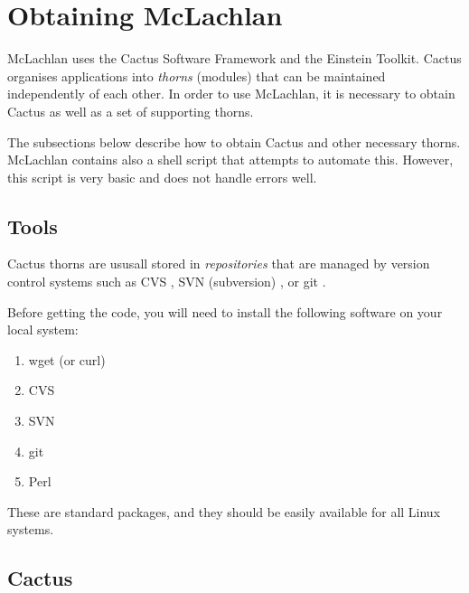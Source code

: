 % 



% 



\section{Obtaining McLachlan}

McLachlan uses the Cactus Software Framework and the Einstein Toolkit.
Cactus organises applications into \emph{thorns} (modules) that can be
maintained independently of each other.  In order to use McLachlan, it
is necessary to obtain Cactus as well as a set of supporting thorns.

The subsections below describe how to obtain Cactus and other
necessary thorns.  McLachlan contains also a shell script
 that attempts to automate this.  However, this
script is very basic and does not handle errors well.

\subsection{Tools}

Cactus thorns are ususall stored in \emph{repositories} that are
managed by version control systems such as CVS \cite{cvsweb}, SVN
(subversion) \cite{svnweb}, or git \cite{gitweb}.

Before getting the code, you will need to install the following
software on your local system:
\begin{enumerate}
\item wget (or curl)
\item CVS
\item SVN
\item git
\item Perl
\end{enumerate}
These are standard packages, and they should be easily available for
all Linux systems.

\subsection{Cactus}
\label{sec:cactus}

